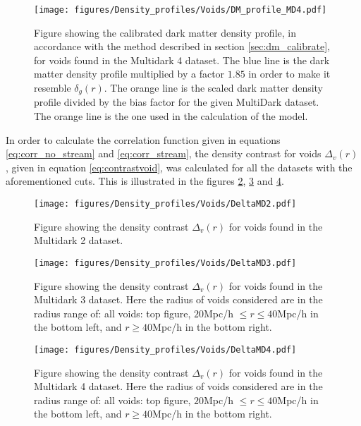 \begin{figure}[H]
    \texttt{[image: figures/Density\_profiles/Voids/DM\_profile\_MD4.pdf]}
    \caption{Figure showing the calibrated dark matter density profile, in accordance with the method described in section \ref{sec:dm_calibrate}, for voids found in the Multidark 4 dataset. The blue line is the dark matter density profile multiplied by a factor $1.85$ in order to make it resemble $\delta_g(r)$. The orange line is the scaled dark matter density profile divided by the bias factor for the given MultiDark dataset. The orange line is the one used in the calculation of the model.}
    \label{fig:deltadmMD4}
\end{figure}
In order to calculate the correlation function given in equations \ref{eq:corr_no_stream} and \ref{eq:corr_stream}, the density contrast for voids $\Delta_v(r)$, given in equation \ref{eq:contrastvoid}, was calculated for all the datasets with the aforementioned cuts. This is illustrated in the figures \ref{fig:DeltaMD2}, \ref{fig:DeltaMD3} and \ref{fig:DeltaMD4}. 
\begin{figure}[H]
    \texttt{[image: figures/Density\_profiles/Voids/DeltaMD2.pdf]}
    \caption{Figure showing the density contrast $\Delta_v(r)$ for voids found in the Multidark 2 dataset.}
    \label{fig:DeltaMD2}
\end{figure}
\begin{figure}[H]
    \texttt{[image: figures/Density\_profiles/Voids/DeltaMD3.pdf]}
    \caption{Figure showing the density contrast $\Delta_v(r)$ for voids found in the Multidark 3 dataset. Here the radius of voids considered are in the radius range of: all voids: top figure, $20$Mpc/h $\leq r\leq 40$Mpc/h in the bottom left, and $r\geq 40$Mpc/h in the bottom right.}
    \label{fig:DeltaMD3}
\end{figure}
\begin{figure}[H]
    \texttt{[image: figures/Density\_profiles/Voids/DeltaMD4.pdf]}
    \caption{Figure showing the density contrast $\Delta_v(r)$ for voids found in the Multidark 4 dataset. Here the radius of voids considered are in the radius range of: all voids: top figure, $20$Mpc/h $\leq r\leq 40$Mpc/h in the bottom left, and $r\geq 40$Mpc/h in the bottom right.}
    \label{fig:DeltaMD4}
\end{figure}

